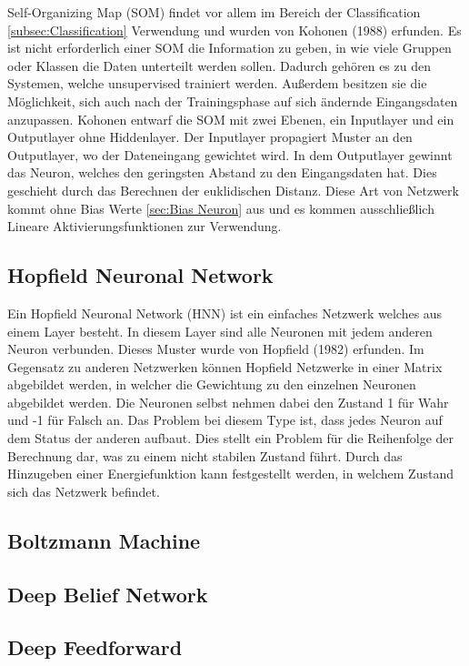 Self-Organizing Map (SOM) findet vor allem im Bereich der Classification \ref{subsec:Classification} Verwendung und wurden von Kohonen (1988) erfunden. 
Es ist nicht erforderlich einer SOM die Information zu geben, in wie viele Gruppen oder Klassen die Daten unterteilt werden sollen. 
Dadurch gehören es zu den Systemen, welche unsupervised trainiert werden. 
Außerdem besitzen sie die Möglichkeit, sich auch nach der Trainingsphase auf sich ändernde Eingangsdaten anzupassen. 
Kohonen entwarf die SOM mit zwei Ebenen, ein Inputlayer und ein Outputlayer ohne Hiddenlayer. 
Der Inputlayer propagiert Muster an den Outputlayer, wo der Dateneingang gewichtet wird. 
In dem Outputlayer gewinnt das Neuron, welches den geringsten Abstand zu den Eingangsdaten hat.
Dies geschieht durch das Berechnen der euklidischen Distanz. 
Diese Art von Netzwerk kommt ohne Bias Werte \ref{sec:Bias Neuron} aus und es kommen ausschließlich Lineare Aktivierungsfunktionen zur Verwendung.


\subsection{Hopfield Neuronal Network}

Ein Hopfield Neuronal Network (HNN) ist ein einfaches Netzwerk welches aus einem Layer besteht. 
In diesem Layer sind alle Neuronen mit jedem anderen Neuron verbunden. 
Dieses Muster wurde von Hopfield (1982) erfunden.
Im Gegensatz zu anderen Netzwerken können Hopfield Netzwerke in einer Matrix abgebildet werden, in welcher die Gewichtung zu den einzelnen Neuronen abgebildet werden. 
Die Neuronen selbst nehmen dabei den Zustand 1 für Wahr und -1 für Falsch an.
Das Problem bei diesem Type ist, dass jedes Neuron auf dem Status der anderen aufbaut.
Dies stellt ein Problem für die Reihenfolge der Berechnung dar, was zu einem nicht stabilen Zustand führt.
Durch das Hinzugeben einer Energiefunktion kann festgestellt werden, in welchem Zustand sich das Netzwerk befindet.

\subsection{Boltzmann Machine}



\subsection{Deep Belief Network}

\subsection{Deep Feedforward}
\label{subsec:Deep Feedforward}

